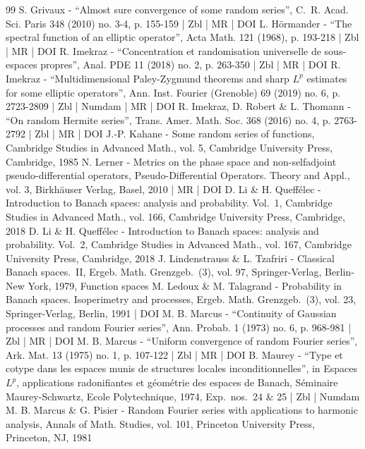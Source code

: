 \documentclass[10pt]{amsart}
\theoremstyle{theorem}
\theoremstyle{definition}
\begin{document}
\begin{thebibliography}{99}
S. Grivaux - “Almost sure convergence of some random series”, C. R. Acad. Sci. Paris 348 (2010) no. 3-4, p. 155-159 | Zbl | MR | DOI
L. Hörmander - “The spectral function of an elliptic operator”, Acta Math. 121 (1968), p. 193-218 | Zbl | MR | DOI
R. Imekraz - “Concentration et randomisation universelle de sous-espaces propres”, Anal. PDE 11 (2018) no. 2, p. 263-350 | Zbl | MR | DOI
R. Imekraz - “Multidimensional Paley-Zygmund theorems and sharp ${L}^p$ estimates for some elliptic operators”, Ann. Inst. Fourier (Grenoble) 69 (2019) no. 6, p. 2723-2809 | Zbl | Numdam | MR | DOI
R. Imekraz, D. Robert \& L. Thomann - “On random Hermite series”, Trans. Amer. Math. Soc. 368 (2016) no. 4, p. 2763-2792 | Zbl | MR | DOI
J.-P. Kahane - Some random series of functions, Cambridge Studies in Advanced Math., vol. 5, Cambridge University Press, Cambridge, 1985
N. Lerner - Metrics on the phase space and non-selfadjoint pseudo-differential operators, Pseudo-Differential Operators. Theory and Appl., vol. 3, Birkhäuser Verlag, Basel, 2010 | MR | DOI
D. Li \& H. Queffélec - Introduction to Banach spaces: analysis and probability. Vol. 1, Cambridge Studies in Advanced Math., vol. 166, Cambridge University Press, Cambridge, 2018
D. Li \& H. Queffélec - Introduction to Banach spaces: analysis and probability. Vol. 2, Cambridge Studies in Advanced Math., vol. 167, Cambridge University Press, Cambridge, 2018
J. Lindenstrauss \& L. Tzafriri - Classical Banach spaces. II, Ergeb. Math. Grenzgeb. (3), vol. 97, Springer-Verlag, Berlin-New York, 1979, Function spaces
M. Ledoux \& M. Talagrand - Probability in Banach spaces. Isoperimetry and processes, Ergeb. Math. Grenzgeb. (3), vol. 23, Springer-Verlag, Berlin, 1991 | DOI
M. B. Marcus - “Continuity of Gaussian processes and random Fourier series”, Ann. Probab. 1 (1973) no. 6, p. 968-981 | Zbl | MR | DOI
M. B. Marcus - “Uniform convergence of random Fourier series”, Ark. Mat. 13 (1975) no. 1, p. 107-122 | Zbl | MR | DOI
B. Maurey - “Type et cotype dans les espaces munis de structures locales inconditionnelles”, in Espaces $L^{p}$, applications radonifiantes et géométrie des espaces de Banach, Séminaire Maurey-Schwartz, Ecole Polytechnique, 1974, Exp. nos. 24 \& 25 | Zbl | Numdam
M. B. Marcus \& G. Pisier - Random Fourier series with applications to harmonic analysis, Annals of Math. Studies, vol. 101, Princeton University Press, Princeton, NJ, 1981

\end{thebibliography}
\end{document}
